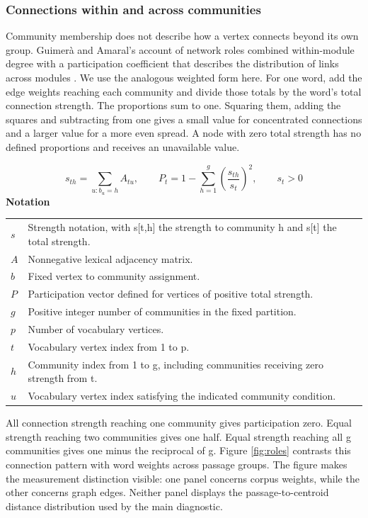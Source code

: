 \documentclass[10pt,letterpaper]{article}
\newcommand{\notlabel}{\noindent\textbf{Notation}\par\nobreak\vspace{4pt}}
\begin{document}
\subsubsection{Connections within and across communities}
Community membership does not describe how a vertex connects beyond its own group. Guimerà and Amaral's account of network roles combined within-module degree with a participation coefficient that describes the distribution of links across modules \cite{guimera}. We use the analogous weighted form here. For one word, add the edge weights reaching each community and divide those totals by the word's total connection strength. The proportions sum to one. Squaring them, adding the squares and subtracting from one gives a small value for concentrated connections and a larger value for a more even spread. A node with zero total strength has no defined proportions and receives an unavailable value.\par

\par\noindent\begin{minipage}{\linewidth}
\begin{equation}\label{eq:participation}
s_{th}=\sum_{u:b_u=h}A_{tu},\qquad P_t=1-\sum_{h=1}^{g}\left(\frac{s_{th}}{s_t}\right)^2,\qquad s_t>0
\end{equation}
\notlabel
{\fontsize{8.5}{10.5}\selectfont\setlength{\tabcolsep}{0pt}\renewcommand{\arraystretch}{1.12}
\begin{tabularx}{\linewidth}{@{}p{.14\linewidth}X@{}}
$s$ & Strength notation, with s[t,h] the strength to community h and s[t] the total strength.\\
$A$ & Nonnegative lexical adjacency matrix.\\
$b$ & Fixed vertex to community assignment.\\
$P$ & Participation vector defined for vertices of positive total strength.\\
$g$ & Positive integer number of communities in the fixed partition.\\
$p$ & Number of vocabulary vertices.\\
$t$ & Vocabulary vertex index from 1 to p.\\
$h$ & Community index from 1 to g, including communities receiving zero strength from t.\\
$u$ & Vocabulary vertex index satisfying the indicated community condition.\\
\end{tabularx}}
\par\vspace{2pt}
\end{minipage}\par
All connection strength reaching one community gives participation zero. Equal strength reaching two communities gives one half. Equal strength reaching all g communities gives one minus the reciprocal of g. Figure \ref{fig:roles} contrasts this connection pattern with word weights across passage groups. The figure makes the measurement distinction visible: one panel concerns corpus weights, while the other concerns graph edges. Neither panel displays the passage-to-centroid distance distribution used by the main diagnostic.\par
\end{document}
